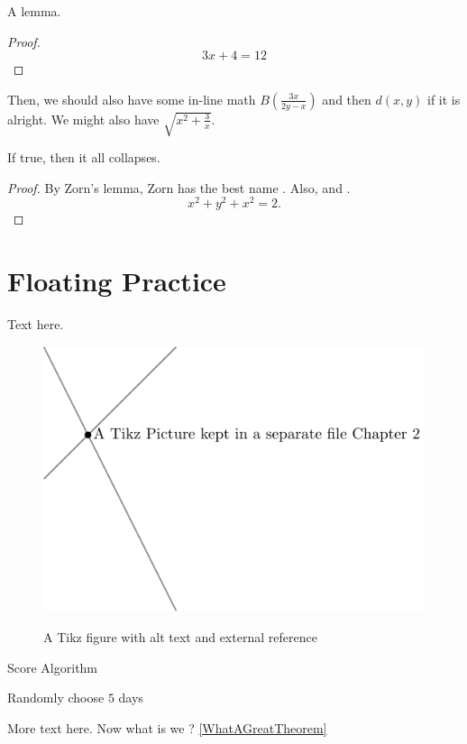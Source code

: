 \begin{lemma}
  A lemma.
\end{lemma}
\begin{proof} ~ %
  \[3x+4=12\]
\end{proof}

Then, we should also have some in-line math $B\left(\frac{3x}{2y-x}\right)$ and then $d(x,y)$ if it is alright. We might also have $\sqrt{x^2+\frac{3}{x}}$.

\begin{theorem}
  If true, then it all collapses.
  \label{WhatAGreatTheorem}
\end{theorem}
\begin{proof}
  By Zorn's lemma, Zorn has the best name \autocite{martiniCompleteReducedConvex2019}.
  Also, \autocite{chenGraphHomotopyGraham2001} and \autocite{dochtermannMinimalGraphsContractible2023}.
  \[x^2+y^2+x^2=2.\]

\end{proof}
\section{Floating Practice}
Text here.

\begin{figure}\centering
  \includegraphics[alt={two lines intersecting at a point}]{Images/tikzPic.pdf}
  \caption{A Tikz figure with alt text and external reference}
\end{figure}

\begin{algorithm}
  \caption{Score Algorithm}
  \begin{algorithmic}[1]
    \Statex
    \State Randomly choose $5$ days
    \EndFor
    \EndFor
  \end{algorithmic}
\end{algorithm}

More text here. Now what is we ?
\autoref{WhatAGreatTheorem}

\printbibliography[heading=subbibnumbered]

